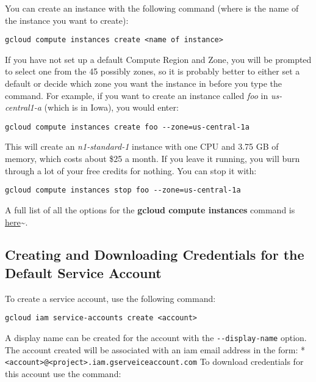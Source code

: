 You can create an instance with the following command (where is the name
of the instance you want to create):

\begin{lstlisting}
gcloud compute instances create <name of instance> 
\end{lstlisting}

If you have not set up a default Compute Region and Zone, you will be
prompted to select one from the 45 possibly zones, so it is probably
better to either set a default or decide which zone you want the
instance in before you type the command. For example, if you want to
create an instance called \emph{foo} in \emph{us-central1-a} (which is
in Iowa), you would enter:

\begin{lstlisting}
gcloud compute instances create foo --zone=us-central-1a 
\end{lstlisting}

This will create an \emph{n1-standard-1} instance with one CPU and 3.75
GB of memory, which costs about \$25 a month. If you leave it running,
you will burn through a lot of your free credits for nothing. You can
stop it with:

\begin{lstlisting}
gcloud compute instances stop foo --zone=us-central-1a 
\end{lstlisting}

A full list of all the options for the \textbf{gcloud compute instances}
command is
\href{https://cloud.google.com/sdk/gcloud/reference/compute/instances/}{here}\textasciitilde{}\cite{hid-sp18-419-tutorial-gce-reference}.

\subsection{Creating and Downloading Credentials for the Default Service Account}

To create a service account, use the following command:

\begin{lstlisting}
gcloud iam service-accounts create <account> 
\end{lstlisting}

A display name can be created for the account with the
\texttt{-\/-display-name} option. The account created will be associated
with an iam email address in the form: *
\texttt{\textless{}account\textgreater{}@\textless{}project\textgreater{}.iam.gserveiceaccount.com}
To download credentials for this account use the command:

